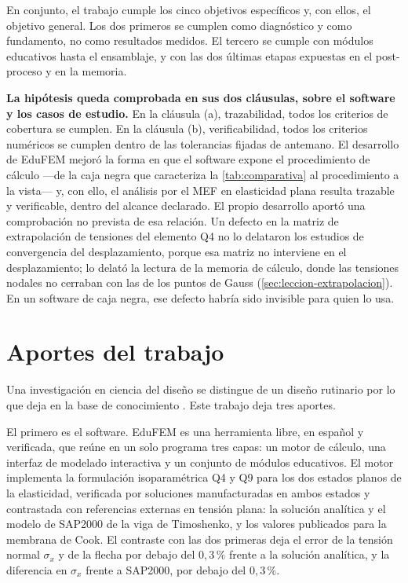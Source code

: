 En conjunto, el trabajo cumple los cinco objetivos específicos y, con ellos, el objetivo general. Los dos primeros se cumplen como diagnóstico y como fundamento, no como resultados medidos. El tercero se cumple con módulos educativos hasta el ensamblaje, y con las dos últimas etapas expuestas en el post-proceso y en la memoria.

\textbf{La hipótesis queda comprobada en sus dos cláusulas, sobre el software y los casos de estudio.} En la cláusula (a), trazabilidad, todos los criterios de cobertura se cumplen. En la cláusula (b), verificabilidad, todos los criterios numéricos se cumplen dentro de las tolerancias fijadas de antemano. El desarrollo de EduFEM mejoró la forma en que el software expone el procedimiento de cálculo —de la caja negra que caracteriza la \autoref{tab:comparativa} al procedimiento a la vista— y, con ello, el análisis por el MEF en elasticidad plana resulta trazable y verificable, dentro del alcance declarado. El propio desarrollo aportó una comprobación no prevista de esa relación. Un defecto en la matriz de extrapolación de tensiones del elemento Q4 no lo delataron los estudios de convergencia del desplazamiento, porque esa matriz no interviene en el desplazamiento; lo delató la lectura de la memoria de cálculo, donde las tensiones nodales no cerraban con las de los puntos de Gauss (\autoref{sec:leccion-extrapolacion}). En un software de caja negra, ese defecto habría sido invisible para quien lo usa.

\section*{Aportes del trabajo}

Una investigación en ciencia del diseño se distingue de un diseño rutinario por lo que deja en la base de conocimiento \autocite[p.~81]{hevner2004design}. Este trabajo deja tres aportes.

El primero es el software. EduFEM es una herramienta libre, en español y verificada, que reúne en un solo programa tres capas: un motor de cálculo, una interfaz de modelado interactiva y un conjunto de módulos educativos. El motor implementa la formulación isoparamétrica Q4 y Q9 para los dos estados planos de la elasticidad, verificada por soluciones manufacturadas en ambos estados y contrastada con referencias externas en tensión plana: la solución analítica y el modelo de SAP2000 de la viga de Timoshenko, y los valores publicados para la membrana de Cook. El contraste con las dos primeras deja el error de la tensión normal $\sigma_x$ y de la flecha por debajo del $0{,}3\,\%$ frente a la solución analítica, y la diferencia en $\sigma_x$ frente a SAP2000, por debajo del $0{,}3\,\%$.

